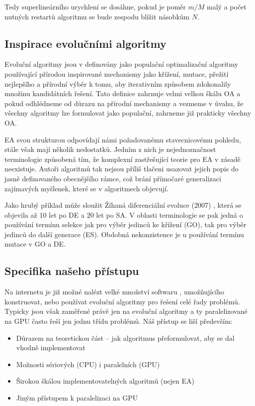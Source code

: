 Tedy superlineárního urychlení se dosáhne, pokud je poměr $m/M$ malý a počet nutných restartů algoritmu se bude zespodu blížit násobkům $N$. 

\subsection{Inspirace evolučními algoritmy}
Evoluční algoritmy jsou v \cite{GO ebook} definovány jako \bq populační optimalizační algoritmy používající přírodou inspirované mechanismy jako křížení, mutace, přežití nejlepšího a přírodní výběr k tomu, aby iterativním způsobem zdokonalily množinu kandidátních řešení\eq. Tato definice zahrnuje velmi velkou škálu OA a pokud odhlédneme od důrazu na přírodní mechanismy a vezmeme v úvahu, že všechny algoritmy lze formulovat jako populační, zahrneme již prakticky všechny OA.

EA svou strukturou odpovídají námi požadovanému stavecnicovému pohledu, stále však mají několik nedostatků. Jedním z nich je nejednoznačnost terminologie způsobená tím, že komplexní zastřešující teorie pro EA v zásadě neexistuje. Autoři algoritmů tak nejsou příliš tlačeni usazovat jejich popis do jasně definovaného obecnějšího rámce, což brání přímočaré generalizaci zajímavých myšlenek, které se v algoritmech objevují.

Jako hrubý příklad může sloužit Žíhaná diferenciální evoluce (2007) \cite{DE annealed}, která se objevila až 10 let po DE a 20 let po SA. V oblasti terminologie se pak jedná o používání termínu selekce jak pro výběr jedinců ke křížení (GO), tak pro výběr jedinců do další generace (ES). Obdobná nekonzistence je u používání termínu mutace v GO a DE.

\subsection{Specifika našeho přístupu} 
Na internetu je již možné nalézt velké množství softwaru \cite{Evolving Objects}, \cite{PUGACE} umožňujícího konstruovat, nebo používat evoluční algoritmy pro řešení celé řady problémů. Typicky jsou však zaměřené právě jen na evoluční algoritmy a ty paralelizované na GPU často řeší jen jednu třídu problémů. Náš přístup se liší především:
\begin{itemize}
  \item Důrazem na teoretickou část -- jak algoritmus přeformulovat, aby se dal vhodně implementovat
  \item Možnosti sériových (CPU) i paralelních (GPU)
  \item Širokou škálou implementovatelných algoritmů (nejen EA)
  \item Jiným přístupem k paralelizaci na GPU 
\end{itemize}

